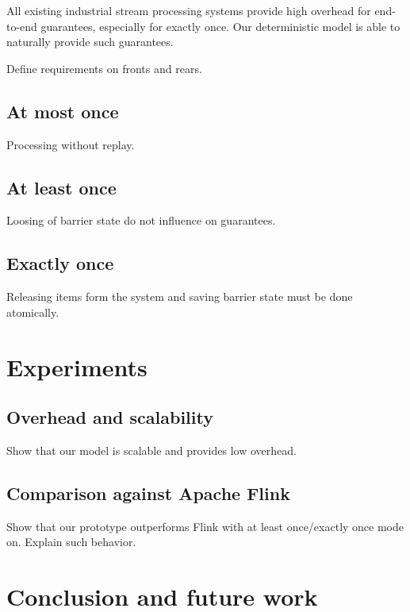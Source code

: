 \documentclass[sigconf]{acmart}
\theoremstyle{remark}
\begin{document}
All existing industrial stream processing systems provide high overhead for end-to-end guarantees, especially for exactly once. Our deterministic model is able to naturally provide such guarantees.

Define requirements on fronts and rears.

\subsection{At most once}
Processing without replay.

\subsection{At least once}
Loosing of barrier state do not influence on guarantees.

\subsection{Exactly once}
Releasing items form the system and saving barrier state must be done atomically.

\section {Experiments}

\subsection{Overhead and scalability}
Show that our model is scalable and provides low overhead.

\subsection{Comparison against Apache Flink}
Show that our prototype outperforms Flink with at least once/exactly once mode on. Explain such behavior.

\section {Conclusion and future work}



\end{document}
